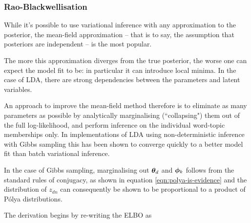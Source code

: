 \subsubsection{Rao-Blackwellisation}
While it's possible to use variational inference with any approximation to the posterior, the mean-field approximation -- that is to say, the assumption that posteriors are independent -- is the most popular. 

The more this approximation diverges from the true posterior, the worse one can expect the model fit to be: in particular it can introduce local minima. In the case of LDA, there are strong dependencies between the parameters and latent variables.

An approach to improve the mean-field method therefore is to eliminate as many parameters as possible by analytically marginalising (``collapsing") them out of the full log-likelihood, and perform inference on the individual word-topic memberships only. In implementations of LDA using non-deterministic inference with Gibbs sampling\cite{Griffiths2004} this has been shown to converge quickly to a better model fit than batch variational inference\cite{Asuncion2012}.

In the case of Gibbs sampling, marginalising out ${ \bm \theta_d }$ and $\bm \phi_k$ follows from the standard rules of conjugacy, as shown in equation \eqref{eqn:polya-is-evidence} and the distribution of $z_{dn}$ can consequently be shown\cite{Griffiths2004}\cite{Heinrich2005} to be proportional to a product of P\'olya distributions.

The derivation begins by re-writing the ELBO as

